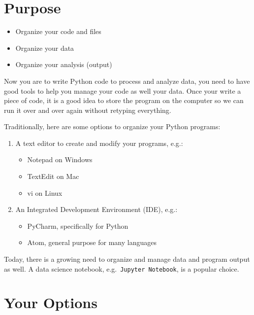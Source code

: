 \documentclass[
  letterpaper,
]{scrbook}
\providecommand{\tightlist}{%
  \setlength{\itemsep}{0pt}\setlength{\parskip}{0pt}}
\begin{document}
\section*{Purpose}\label{purpose}


\begin{itemize}
\tightlist
\item
  Organize your code and files
\item
  Organize your data
\item
  Organize your analysis (output)
\end{itemize}

Now you are to write Python code to process and analyze data, you need
to have good tools to help you manage your code as well your data. Once
your write a piece of code, it is a good idea to store the program on
the computer so we can run it over and over again without retyping
everything.

Traditionally, here are some options to organize your Python programs:

\begin{enumerate}
\def\labelenumi{\arabic{enumi}.}
\tightlist
\item
  A text editor to create and modify your programs, e.g.:

  \begin{itemize}
  \tightlist
  \item
    Notepad on Windows
  \item
    TextEdit on Mac
  \item
    vi on Linux
  \end{itemize}
\item
  An Integrated Development Environment (IDE), e.g.:

  \begin{itemize}
  \tightlist
  \item
    PyCharm, specifically for Python
  \item
    Atom, general purpose for many languages
  \end{itemize}
\end{enumerate}

Today, there is a growing need to organize and manage data and program
output as well. A data science notebook,
e.g.~\texttt{Jupyter\ Notebook}, is a popular choice.

\section*{Your Options}\label{your-options}
\end{document}
